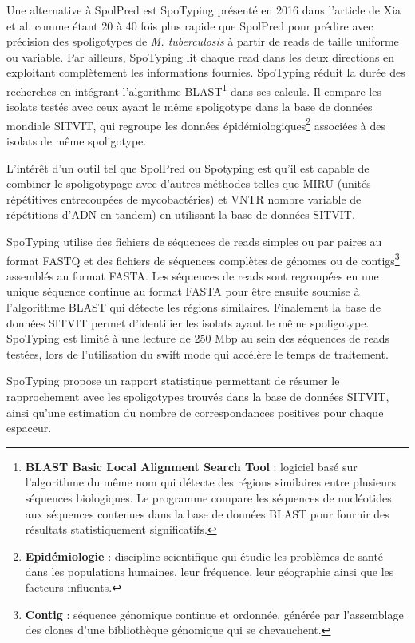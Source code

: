 \documentclass[twoside,a4paper,11pt,frenchb,openany]{report}
\begin{document}
Une alternative à SpolPred est SpoTyping présenté en 2016 dans l'article \cite{xia} de Xia et al. comme étant 20 à 40 fois plus rapide que SpolPred pour prédire avec précision des spoligotypes de \textit{M. tuberculosis} à partir de reads de taille uniforme ou variable. Par ailleurs, SpoTyping lit chaque read dans les deux directions en exploitant complètement les informations fournies. SpoTyping réduit la durée des recherches en intégrant l'algorithme BLAST\footnote{\textbf{BLAST Basic Local Alignment Search Tool} : logiciel basé sur l'algorithme du même nom qui détecte des régions similaires entre plusieurs séquences biologiques. Le programme compare les séquences de nucléotides aux séquences contenues dans la base de données BLAST pour fournir des résultats statistiquement significatifs.} dans ses calculs. Il compare les isolats testés avec ceux ayant le même spoligotype dans la base de données mondiale SITVIT, qui regroupe les données épidémiologiques\footnote{\textbf{Epidémiologie} : discipline scientifique qui étudie les problèmes de santé dans les populations humaines, leur fréquence, leur géographie ainsi que les facteurs influents.} associées à des isolats de même spoligotype.

L'intérêt d'un outil tel que SpolPred ou Spotyping est qu'il est capable de combiner le spoligotypage avec d'autres méthodes telles que MIRU (unités répétitives entrecoupées de mycobactéries) et VNTR nombre variable de répétitions d'ADN en tandem) en utilisant la base de données SITVIT.

SpoTyping utilise des fichiers de séquences de reads simples ou par paires au format FASTQ et des fichiers de séquences complètes de génomes ou de contigs\footnote{\textbf{Contig} : séquence génomique continue et ordonnée, générée par l'assemblage des clones d'une bibliothèque génomique qui se chevauchent.} assemblés au format FASTA. Les séquences de reads sont regroupées en une unique séquence continue au format FASTA pour être ensuite soumise à l'algorithme BLAST qui détecte les régions similaires. Finalement la base de données SITVIT permet d'identifier les isolats ayant le même spoligotype. SpoTyping est limité à une lecture de 250 Mbp au sein des séquences de reads testées, lors de l'utilisation du swift mode qui accélère le temps de traitement.

SpoTyping propose un rapport statistique permettant de résumer le rapprochement avec les spoligotypes trouvés dans la base de données SITVIT, ainsi qu'une estimation du nombre de correspondances positives pour chaque espaceur.
\end{document}
